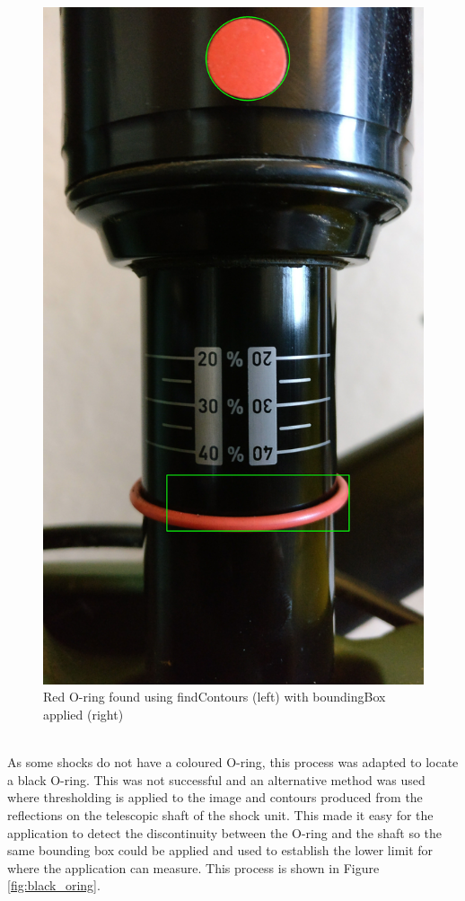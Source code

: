 \begin{figure}[h!]
\begin{minipage}{0.4\textwidth}
					\includegraphics[scale=0.1,
					trim={20cm 30cm 15cm 110cm},
					clip]{../images/results/raw_refs.jpg}				
				\end{minipage}\hfill
				\caption{Red O-ring found using {\ttfamily findContours} (left) with {\ttfamily boundingBox} applied (right)}
				\label{fig:find_oring}
			\end{figure}
			\\
			As some shocks do not have a coloured O-ring, this process was adapted to locate a black O-ring. This was not successful and an alternative method was used where thresholding is applied to the image and contours produced from the reflections on the telescopic shaft of the shock unit. This made it easy for the application to detect the discontinuity between the O-ring and the shaft so the same bounding box could be applied and used to establish the lower limit for where the application can measure. This process is shown in Figure \ref{fig:black_oring}.
